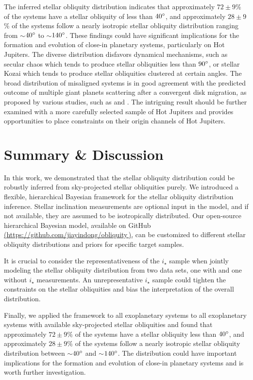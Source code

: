 \documentclass[twocolumn,times]{aastex631}
\begin{document}
The inferred stellar obliquity distribution indicates that approximately $72\pm9$\% of the systems have a stellar obliquity of less than $40\mbox{$^\circ$}$, and approximately $28\pm9$\% of the systems follow a nearly isotropic stellar obliquity distribution ranging from $\sim$$40\mbox{$^\circ$}$ to $\sim$$140\mbox{$^\circ$}$. These findings could have significant implications for the formation and evolution of close-in planetary systems, particularly on Hot Jupiters. The diverse distribution disfavors dynamical mechanisms, such as secular chaos which tends to produce stellar obliquities less than $90\mbox{$^\circ$}$, or stellar Kozai which tends to produce stellar obliquities clustered at certain angles.
The broad distribution of misaligned systems is in good agreement with the predicted outcome of multiple giant planets scattering after a convergent disk migration, as proposed by various studies, such as \cite{Nagasawa11} and \cite{Beague12}. The intriguing result should be further examined with a more carefully selected sample of Hot Jupiters and provides opportunities to place constraints on their origin channels of Hot Jupiters.

\section{Summary \& Discussion}

In this work, we demonstrated that the stellar obliquity distribution could be robustly inferred from sky-projected stellar obliquities purely.
We introduced a flexible, hierarchical Bayesian framework for the stellar obliquity distribution inference. Stellar inclination measurements are optional input in the model, and if not available, they are assumed to be isotropically distributed.
Our open-source hierarchical Bayesian model, available on GitHub \href{https://github.com/jiayindong/obliquity}{(https://github.com/jiayindong/obliquity\,\faGithub)}, can be customized to different stellar obliquity distributions and priors for specific target samples.

It is crucial to consider the representativeness of the $i_\star$ sample when jointly modeling the stellar obliquity distribution from two data sets, one with and one without $i_\star$ measurements. An unrepresentative $i_\star$ sample could tighten the constraints on the stellar obliquities and bias the interpretation of the overall distribution.

Finally, we applied the framework to all exoplanetary systems to all exoplanetary systems with available sky-projected stellar obliquities and found that approximately $72\pm9$\% of the systems have a stellar obliquity less than $40\mbox{$^\circ$}$, and approximately $28\pm9$\% of the systems follow a nearly isotropic stellar obliquity distribution between $\sim$$40\mbox{$^\circ$}$ and $\sim$$140\mbox{$^\circ$}$.
The distribution could have important implications for the formation and evolution of close-in planetary systems and is worth further investigation.
\end{document}
